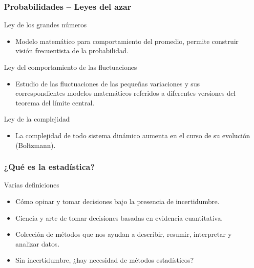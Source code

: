 \documentclass[table]{beamer}
\begin{document}
\begin{frame}
    \frametitle{Probabilidades -- Leyes del azar}
    \begin{block}{Ley de los grandes números}
        \begin{itemize}
            \item Modelo matemático para comportamiento del promedio, permite construir visión frecuentista de la probabilidad.
        \end{itemize}
    \end{block}
    \begin{block}{Ley del comportamiento de las fluctuaciones}
        \begin{itemize}
            \item Estudio de las fluctuaciones de las pequeñas variaciones y sus correspondientes modelos matemáticos referidos a diferentes versiones del teorema del límite central.
        \end{itemize}
    \end{block}
    \begin{block}{Ley de la complejidad}
        \begin{itemize}
            \item La complejidad de todo sistema dinámico aumenta en el curso de su evolución (Boltzmann).
        \end{itemize}
    \end{block}
\end{frame}

\begin{frame}
    \frametitle{¿Qué es la estadística?}
    \begin{block}{Varias definiciones}
        \begin{itemize}
            \item Cómo opinar y tomar decisiones bajo la presencia de incertidumbre.
            \item Ciencia y arte de tomar decisiones basadas en evidencia cuantitativa.
            \item Colección de métodos que nos ayudan a describir, resumir, interpretar y analizar datos.
        \end{itemize}
    \end{block}
    \begin{alertblock}{}
        \begin{itemize}
            \item Sin incertidumbre, ¿hay necesidad de métodos estadísticos?
        \end{itemize}
    \end{alertblock}
\end{frame}
\end{document}
